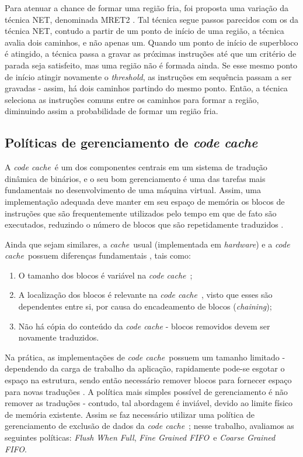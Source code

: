 \documentclass[12pt,twoside]{article}
\newcommand{\ccache}{\emph{code cache}}
\newcommand{\cache}{\emph{cache}}
\newcommand{\flush}{\emph{Flush When Full}}
\newcommand{\finefifo}{\emph{Fine Grained FIFO}}
\newcommand{\coarsefifo}{\emph{Coarse Grained FIFO}}
\begin{document}
Para atenuar a chance de formar uma região fria, foi proposta uma variação da técnica NET, denominada MRET2 \cite{mret2-region}. Tal técnica segue passos parecidos com os da técnica NET, contudo a partir de um ponto de início de uma região, a técnica avalia dois caminhos, e não apenas um. Quando um ponto de início de superbloco é atingido, a técnica passa a gravar as próximas instruções até que um critério de parada seja satisfeito, mas uma região não é formada ainda. Se esse mesmo ponto de início atingir novamente o \emph{threshold}, as instruções em sequência passam a ser gravadas - assim, há dois caminhos partindo do mesmo ponto. Então, a técnica seleciona as instruções comuns entre os caminhos para formar a região, diminuindo assim a probabilidade de formar um região fria.


\subsection{Políticas de gerenciamento de \emph{code cache}}
\label{sec-codecache}
A \ccache~é um dos componentes centrais em um sistema de tradução dinâmica de binários, e o seu bom gerenciamento é uma das tarefas mais fundamentais no desenvolvimento de uma máquina virtual. Assim, uma implementação adequada deve manter em seu espaço de memória os blocos de instruções que são frequentemente utilizados pelo tempo em que de fato são executados, reduzindo o número de blocos que são repetidamente traduzidos \cite{kim-2004-a}.

Ainda que sejam similares, a \cache~usual (implementada em \emph{hardware}) e a \ccache~possuem diferenças fundamentais \cite{smith-vm-book}, tais como:

\begin{enumerate}
\item O tamanho dos blocos é variável na \ccache~;

\item A localização dos blocos é relevante na \ccache~, visto que esses são dependentes entre si, por causa do encadeamento de blocos (\emph{chaining});

\item Não há cópia do conteúdo da \emph{code cache }- blocos removidos devem ser novamente traduzidos.
\end{enumerate}

Na prática, as implementações de \ccache~possuem um tamanho limitado - dependendo da carga de trabalho da aplicação, rapidamente pode-se esgotar o espaço na estrutura, sendo então necessário remover blocos para fornecer espaço para novas traduções \cite{kim-2004}. A política mais simples possível de gerenciamento é não remover as traduções - contudo, tal abordagem é inviável, devido ao limite físico de memória existente. Assim se faz necessário utilizar uma política de gerenciamento de exclusão de dados da \ccache~; nesse trabalho, avaliamos as seguintes políticas: \flush, \finefifo~e \coarsefifo.
\end{document}
